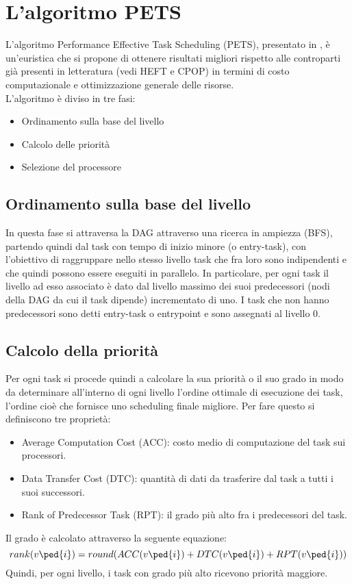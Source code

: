 \chapter{L'algoritmo PETS}\label{capitolo3pets}
\vspace{4cm}
L'algoritmo Performance Effective Task Scheduling (PETS), presentato in \cite{ilavarasan2007low}, è un'euristica che si propone di ottenere risultati migliori rispetto alle controparti già presenti in letteratura (vedi HEFT\cite{993206} e CPOP\cite{993206}) in termini di costo computazionale e ottimizzazione generale delle risorse.
\\
L'algoritmo è diviso in tre fasi:
\begin{itemize}
	\item Ordinamento sulla base del livello
	\item Calcolo delle priorità
	\item Selezione del processore 
\end{itemize}

\section{Ordinamento sulla base del livello}
In questa fase si attraversa la DAG attraverso una ricerca in ampiezza (BFS), partendo quindi dal task con tempo di inizio minore (o entry-task), con l'obiettivo di raggruppare nello stesso livello task che fra loro sono indipendenti e che quindi possono essere eseguiti in parallelo.
In particolare, per ogni task il livello ad esso associato è dato dal livello massimo dei suoi predecessori (nodi della DAG da cui il task dipende) incrementato di uno. I task che non hanno predecessori sono detti entry-task o entrypoint e sono assegnati al livello 0.


\section{Calcolo della priorità}
Per ogni task si procede quindi a calcolare la sua priorità o il suo grado in modo da determinare all'interno di ogni livello l'ordine ottimale di esecuzione dei task, l'ordine cioè che fornisce uno scheduling finale migliore.
Per fare questo si definiscono tre proprietà:
\begin{itemize}
	\item Average Computation Cost (ACC): costo medio di computazione del task sui processori.
	\item Data Transfer Cost (DTC): quantità di dati da trasferire dal task a tutti i suoi successori.
	\item Rank of Predecessor Task (RPT): il grado più alto fra i predecessori del task.
\end{itemize}
Il grado è calcolato attraverso la seguente equazione:
\begin{equation}\label{Grado}
	rank(v\ped{i}) = round(ACC(v\ped{i}) + DTC(v\ped{i}) + RPT(v\ped{i}))
\end{equation}
Quindi, per ogni livello, i task con grado più alto ricevono priorità maggiore.



